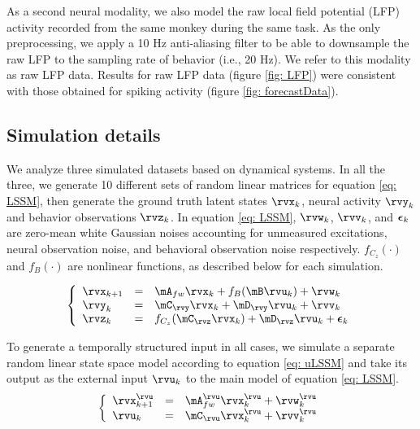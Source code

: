 \documentclass{article} %
\begin{document}
As a second neural modality, we also model the raw local field potential (LFP) activity recorded from the same monkey during the same task. As the only preprocessing, we apply a 10 Hz anti-aliasing filter to be able to downsample the raw LFP to the sampling rate of behavior (i.e., 20 Hz). We refer to this modality as raw LFP data. Results for raw LFP data (figure \ref{fig: LFP}) were consistent with those obtained for spiking activity (figure \ref{fig: forecastData}).

\subsection{Simulation details}\label{app: simDetails}
We analyze three simulated datasets based on dynamical systems. In all the three, we generate 10 different sets of random linear matrices for equation \ref{eq: LSSM}, then generate the ground truth latent states \(\rvx_{k}\), neural activity \(\rvy_{k}\) and behavior observations \(\rvz_{k}\). In equation \ref{eq: LSSM}, $\rvw_{k}$, $\rvv_{k}$, and ${\boldsymbol{\epsilon}}_{k}$ are zero-mean white Gaussian noises accounting for unmeasured excitations, neural observation noise, and behavioral observation noise respectively. \(f_{C_z}(\cdot)\) and \(f_B(\cdot)\) are nonlinear functions, as described below for each simulation.

\begin{equation}\label{eq: LSSM}
    \left\{
    \begin{array}{lcl}
    \rvx_{k+1} &=& \mA_{fw} \rvx_{k} + f_B( \mB \rvu_{k}) + \rvw_{k}\\  
    \rvy_{k} &=& \mC_{\rvy} \rvx_{k} + \mD_{\rvy} \rvu_{k} + \rvv_{k}\\
    \rvz_{k} &=& f_{C_z}(\mC_{\rvz} \rvx_{k}) + \mD_{\rvz} \rvu_{k} + \beps_{k}
    \end{array}
    \right.
\end{equation}

To generate a temporally structured input in all cases, we simulate a separate random linear state space model according to equation \ref{eq: uLSSM} and take its output as the external input \(\rvu_{k}\) to the main model of equation \ref{eq: LSSM}.
\begin{equation}\label{eq: uLSSM}
    \left\{
    \begin{array}{lcl}
    \rvx^\rvu_{k+1} &=& \mA_{fw}^\rvu \rvx^\rvu_{k} + \rvw^\rvu_{k}\\  
    \rvu_{k} &=& \mC_{\rvu} \rvx^\rvu_{k} + \rvv^\rvu_{k}
    \end{array}
    \right.
\end{equation}
\end{document}
